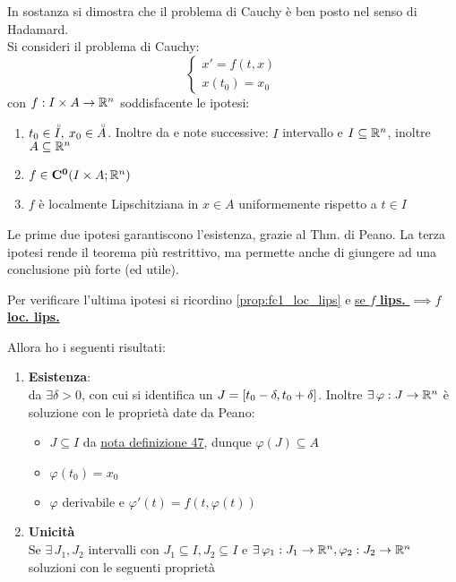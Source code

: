 \begin{theorem}
	\label{teo:cau_locale_part_1}
	In sostanza si dimostra che il problema di Cauchy è ben posto nel senso di Hadamard.\\
	Si consideri il problema di Cauchy:
	$$\begin{cases}x'=f(t,x)\\x(t_0)=x_0\end{cases}$$
	con $f:I\times A \to \mathbb{R}^n$ soddisfacente le ipotesi:
	\begin{enumerate}
		\item $t_0\in \accentset{\circ}{I},\:x_0\in \accentset{\circ}{A}$. Inoltre da  e note successive: $I$ intervallo e $I\subseteq \mathbb{R}^n$, inoltre $A\subseteq \mathbb{R}^n$
		\item $f\in \mathbf{C^{0}}(I\times A; \mathbb{R}^n)$ 
		\item $f$ è localmente Lipschitziana in $x\in A$ uniformemente rispetto a $t\in I$
	\end{enumerate}
	\begin{note}
		Le prime due ipotesi garantiscono l'esistenza, grazie al Thm. di Peano. La terza ipotesi rende il teorema più restrittivo, ma permette anche di giungere ad una conclusione più forte (ed utile).
	\end{note}
	\begin{note}
		Per verificare l'ultima ipotesi si ricordino \ref{prop:fc1_loc_lips} e \hyperlink{note:if_lips_then_loclips}{se $f$ \textbf{lips.} $\implies f$ \textbf{loc. lips.}}
	\end{note}
	Allora ho i seguenti risultati:
	\begin{enumerate}
		\item \textbf{Esistenza}:\\
		da  $\exists \delta>0$, con cui si identifica un $J=\left[t_0-\delta,t_0+\delta\right]$. Inoltre $\exists\,\varphi : J \to \mathbb{R}^n$ è soluzione con le proprietà date da Peano:
		\begin{itemize}
			\item $J\subseteq I$ da \hyperlink{note:diff_eq_sol_definit_set}{nota definizione 47}, dunque $\varphi(J)\subseteq A$
			\item $\varphi(t_0)=x_0$
			\item $\varphi$ derivabile e $\varphi'(t)=f(t,\varphi(t))$
		\end{itemize}
		\item \textbf{Unicità}\\
		Se $\exists\,J_1,J_2$ intervalli con $J_1\subseteq I,J_2\subseteq I$ e $\exists\,\varphi_1:J_1\to \mathbb{R}^n, \varphi_2:J_2\to \mathbb{R}^n$ soluzioni con le seguenti proprietà

\end{enumerate}
\end{theorem}
